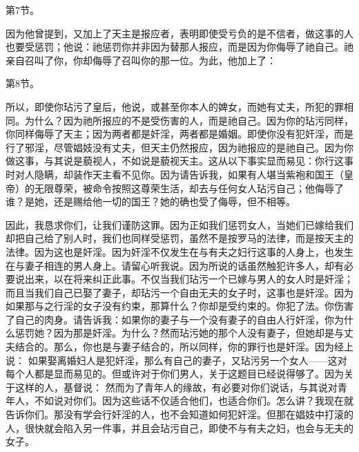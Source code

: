 第7节。 \par

因为他曾提到，又加上了天主是报应者，表明即使受亏负的是不信者，做这事的人也要受惩罚；他说：祂惩罚你并非因为替那人报应，而是因为你侮辱了祂自己。祂亲自召叫了你，你却侮辱了召叫你的那一位。为此，他加上了：\par

第8节。 \par

所以，即使你玷污了皇后，他说，或甚至你本人的婢女，而她有丈夫，所犯的罪相同。为什么？因为祂所报应的不是受伤害的人，而是祂自己。因为你的玷污同样，你同样侮辱了天主；因为两者都是奸淫，两者都是婚姻。即使你没有犯奸淫，而是行了邪淫，尽管娼妓没有丈夫，但天主仍然报应，因为祂报应的是祂自己。因为你做这事，与其说是藐视人，不如说是藐视天主。这从以下事实显而易见：你行这事时对人隐瞒，却装作天主看不见你。因为请告诉我，如果有人堪当紫袍和国王（皇帝）的无限尊荣，被命令按照这尊荣生活，却去与任何女人玷污自己；他侮辱了谁？是她，还是赐给他一切的国王？她的确也受了侮辱，但不相等。\par

因此，我恳求你们，让我们谨防这罪。因为正如我们惩罚女人，当她们已嫁给我们却把自己给了别人时，我们也同样受惩罚，虽然不是按罗马的法律，而是按天主的法律。因为这也是奸淫。因为奸淫不仅发生在与有夫之妇行这事的人身上，也发生在与妻子相连的男人身上。请留心听我说。因为所说的话虽然触犯许多人，却有必要说出来，以在将来纠正此事。不仅当我们玷污一个已嫁与男人的女人时是奸淫；而且当我们自己已娶了妻子，却玷污一个自由无夫的女子时，这事也是奸淫。因为如果那与之行淫的女子没有约束，那算什么？你却是受约束的。你犯了法。你伤害了自己的肉身。请告诉我：如果你的妻子与一个没有妻子的自由人行奸淫，你为什么惩罚她？因为那是奸淫。为什么？然而玷污她的那个人没有妻子，但她却是与丈夫结合的。那么，你也是与妻子结合的，所以同样，你的罪行也是奸淫。因为经上说：  如果娶离婚妇人是犯奸淫，那么有自己的妻子，又玷污另一个女人——这对每个人都是显而易见的。但或许对于你们男人，关于这题目已经说得够了。因为关于这样的人，基督说：  然而为了青年人的缘故，有必要对你们说话，与其说对青年人，不如说对你们。因为这些话不仅适合他们，也适合你们。怎么讲？我现在就告诉你们。那没有学会行奸淫的人，也不会知道如何犯奸淫。但那在娼妓中打滚的人，很快就会陷入另一件事，并且会玷污自己，即使不与有夫之妇，也会与无夫的女子。\par

